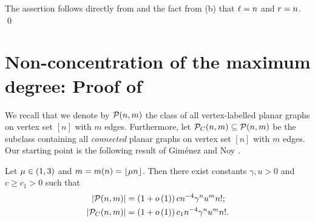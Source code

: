 The assertion follows directly from  and the fact from (b) that $\ell=n$ and $r=n$. \qed

\section[Non-concentration of the maximum degree]{Non-concentration of the maximum degree: Proof of }\label{MDsec:planar_dense}
We recall that we denote by $\mathcal{P}(n,m)$ the class of all vertex-labelled planar graphs on vertex set $[n]$ with $m$ edges. Furthermore, let $\mathcal{P}_C(n,m)\subseteq\mathcal{P}(n,m)$ be the subclass containing all {\em connected} planar graphs on vertex set $[n]$ with $m$ edges. Our starting point is the following result of Gim\'enez and Noy \cite{GimenezNoy2009}.
\begin{thm}\label{MDthm:number_planar}
Let $\mu \in (1,3)$ and $m=m(n)=\left\lfloor\mu n\right\rfloor$. Then there exist constants $\gamma, u>0$ and $c\geq c_1>0$ such that
\begin{align*}
\left|\mathcal{P}(n,m)\right|&=\left(1+o\left(1\right)\right)c n^{-4}\gamma^n u^m n!;\\
\left|\mathcal{P}_C(n,m)\right|&=\left(1+o\left(1\right)\right)c_1 n^{-4}\gamma^n u^m n!.
\end{align*}
\end{thm}

